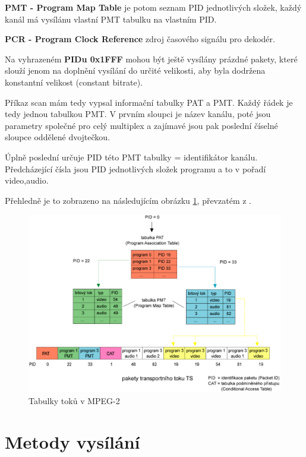 \textbf{PMT - Program Map Table} je potom seznam PID jednotlivých složek, každý kanál má vysílánu vlastní PMT tabulku na vlastním PID.

\textbf{PCR - Program Clock Reference} zdroj časového signálu pro dekodér.

Na vyhrazeném \textbf{PIDu 0x1FFF} mohou být ještě vysílány prázdné pakety, které slouží jenom na doplnění vysílání do určité velikosti, aby byla dodržena konstantní velikost (constant bitrate).

Příkaz scan mám tedy vypsal informační tabulky PAT a PMT. Každý řádek je tedy jednou tabulkou PMT. V prvním sloupci je název kanálu, poté jsou parametry společné pro celý multiplex a zajímavé jsou pak poslední číselné sloupce oddělené dvojtečkou.

Úplně poslední určuje PID této PMT tabulky = identifikátor kanálu.
Předcházející čísla jsou PID jednotlivých složek programu a to v pořadí video,audio.

Přehledně je to zobrazeno na následujícím obrázku \ref{fig:PATaPMT}, převzatém z \cite{digitvURL}.

\vspace{10pt}

\begin{figure}[ht]
\begin{center}
\includegraphics[width=15cm]{images/PATaPMT.eps}
\caption{Tabulky toků v MPEG-2}
\label{fig:PATaPMT}
\end{center}
\end{figure}

\section{Metody vysílání}

